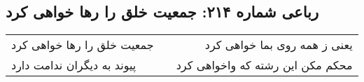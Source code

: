 \begin{center}
\section*{رباعی شماره ۲۱۴: جمعیت خلق را رها خواهی کرد}
\label{sec:sh214}
\begin{longtable}{l p{0.5cm} r}
جمعیت خلق را رها خواهی کرد
&&
یعنی ز همه روی بما خواهی کرد
\\
پیوند به دیگران ندامت دارد
&&
محکم مکن این رشته که واخواهی کرد
\\
\end{longtable}
\end{center}
